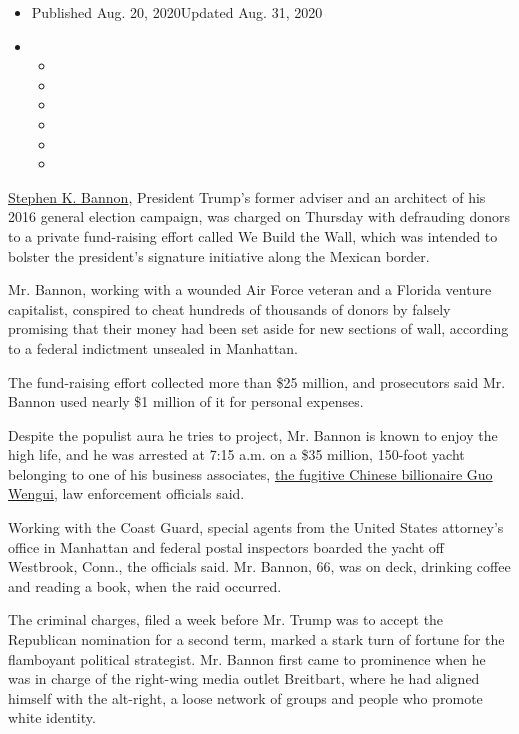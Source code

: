 \begin{itemize}
\item
  Published Aug. 20, 2020Updated Aug. 31, 2020
\item
  \begin{itemize}
  \item
  \item
  \item
  \item
  \item
  \item
  \end{itemize}
\end{itemize}

\href{https://www.nytimes3xbfgragh.onion/2020/08/31/nyregion/steve-bannon-build-the-wall-fraud.html}{Stephen
K. Bannon}, President Trump's former adviser and an architect of his
2016 general election campaign, was charged on Thursday with defrauding
donors to a private fund-raising effort called We Build the Wall, which
was intended to bolster the president's signature initiative along the
Mexican border.

Mr. Bannon, working with a wounded Air Force veteran and a Florida
venture capitalist, conspired to cheat hundreds of thousands of donors
by falsely promising that their money had been set aside for new
sections of wall, according to a federal indictment unsealed in
Manhattan.

The fund-raising effort collected more than \$25 million, and
prosecutors said Mr. Bannon used nearly \$1 million of it for personal
expenses.

Despite the populist aura he tries to project, Mr. Bannon is known to
enjoy the high life, and he was arrested at 7:15 a.m. on a \$35 million,
150-foot yacht belonging to one of his business associates,
\href{https://www.nytimes3xbfgragh.onion/2019/12/23/us/politics/steve-bannon-guo-wengui.html}{the
fugitive Chinese billionaire Guo Wengui}, law enforcement officials
said.

Working with the Coast Guard, special agents from the United States
attorney's office in Manhattan and federal postal inspectors boarded the
yacht off Westbrook, Conn., the officials said. Mr. Bannon, 66, was on
deck, drinking coffee and reading a book, when the raid occurred.

The criminal charges, filed a week before Mr. Trump was to accept the
Republican nomination for a second term, marked a stark turn of fortune
for the flamboyant political strategist. Mr. Bannon first came to
prominence when he was in charge of the right-wing media outlet
Breitbart, where he had aligned himself with the alt-right, a loose
network of groups and people who promote white identity.

